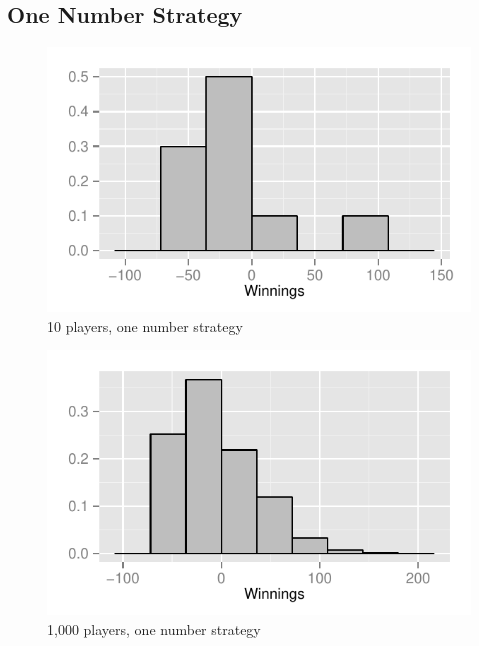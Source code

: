 \documentclass[landscape]{exam}
\begin{document}
  \subsection{One Number Strategy} %
  
  \begin{figure}[H]
    \centering
    \includegraphics[scale = 0.9]{figures/roulette/1_10_50_fraction.pdf}
    \caption{10 players, one number strategy}
  \end{figure}

  \begin{figure}[H]
    \centering
    \includegraphics[scale = 0.9]{figures/roulette/1_1000_50_fraction.pdf}
    \caption{1,000 players, one number strategy}
  \end{figure}
\end{document}

